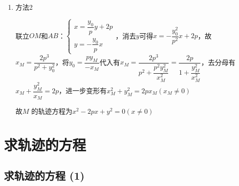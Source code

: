 \begin{enumerate}
\begin{jieda}
\begin{enumerate}
\begin{enumerate}
                $M$满足$OM$和$AB$直线方程，消去$y_0$即可得到$M$的轨迹方程.

                $\left\{\begin{array}{l}
                 x = \dfrac{y_0}{p} y + 2p  \\
                 y = -\dfrac{y_0}{p}x 
                \end{array}\right. \Longleftrightarrow \left\{\begin{array}{l}
                 y_0 = \dfrac{p(x-2p)}{y}  \\
                 y_0 = -\dfrac{py}{x} 
                \end{array}\right.$
                消去$y_0$得到$-\dfrac{py}{x} = \dfrac{p(x-2p)}{y}$，故$M$ 的轨迹方程为$x^2 - 2px + y^2 = 0 (x \neq 0)$
                \item 方法2

                联立$OM$和$AB$：$\left\{\begin{array}{l}
                 x = \dfrac{y_0}{p} y + 2p  \\
                 y = -\dfrac{y_0}{p}x 
                \end{array}\right.$，消去$y$可得$x = -\dfrac{y_0^2}{p^2}x + 2p$，故$x_M = \dfrac{2p^3}{p^2+y_0^2}$，将$y_0 = \dfrac{py_M}{-x_M}$代入有$x_M = \dfrac{2p^3}{p^2+\dfrac{p^2y_M^2}{x_M^2}} = \dfrac{2p}{1+\dfrac{y_M^2}{x_M^2}}$，去分母有$x_M + \dfrac{y_M^2}{x_M} = 2p$，进一步变形有$x_M^2 + y_M^2 = 2px_M (x_M \neq 0)$
    
                故$M$ 的轨迹方程为$x^2 - 2px + y^2 = 0 (x \neq 0)$
            \end{enumerate}
        \end{enumerate}
    \end{jieda}
\end{enumerate}
\section*{求轨迹的方程}
\subsection*{求轨迹的方程 (1)}

